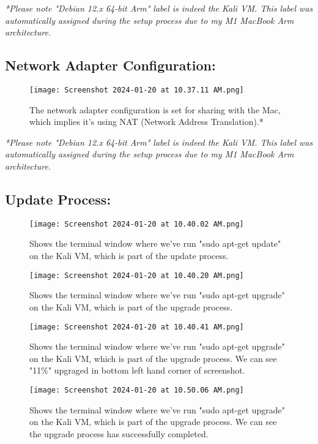\documentclass{article}
\begin{document}
\textit{*Please note "Debian 12.x 64-bit Arm" label is indeed the Kali VM. This label was automatically assigned during the setup process due to my M1 MacBook Arm architecture.}

\subsection{Network Adapter Configuration:}
\begin{figure}[H]
    \centering
    \texttt{[image: Screenshot 2024-01-20 at 10.37.11 AM.png]}
    \caption{The network adapter configuration is set for sharing with the Mac, which implies it's using NAT (Network Address Translation).*}
\end{figure}

\textit{*Please note "Debian 12.x 64-bit Arm" label is indeed the Kali VM. This label was automatically assigned during the setup process due to my M1 MacBook Arm architecture.}

\subsection{Update Process:}
\begin{figure}[H]
    \centering
    \texttt{[image: Screenshot 2024-01-20 at 10.40.02 AM.png]}
    \caption{Shows the terminal window where we've run "sudo apt-get update" on the Kali VM, which is part of the update process.}
\end{figure}

\begin{figure}[H]
    \centering
    \texttt{[image: Screenshot 2024-01-20 at 10.40.20 AM.png]}
    \caption{Shows the terminal window where we've run "sudo apt-get upgrade" on the Kali VM, which is part of the upgrade process.}
\end{figure}

\begin{figure}[H]
    \centering
    \texttt{[image: Screenshot 2024-01-20 at 10.40.41 AM.png]}
    \caption{Shows the terminal window where we've run "sudo apt-get upgrade" on the Kali VM, which is part of the upgrade process. We can see "11\%" upgraged in bottom left hand corner of screenshot.}
\end{figure}

\begin{figure}[H]
    \centering
    \texttt{[image: Screenshot 2024-01-20 at 10.50.06 AM.png]}
    \caption{Shows the terminal window where we've run "sudo apt-get upgrade" on the Kali VM, which is part of the upgrade process. We can see the upgrade process has successfully completed.}
\end{figure}
\end{document}
